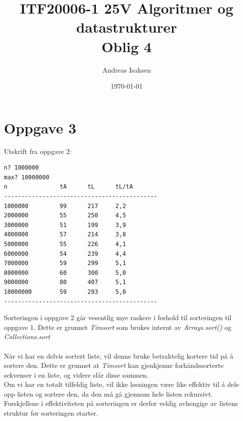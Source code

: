 \documentclass{article}
\begin{document}
  

\title{ITF20006-1 25V Algoritmer og datastrukturer\\Oblig 4}
\author{Andreas Isaksen}  
\date{\today}  
\maketitle  
\pagebreak

\section*{Oppgave 3}
Utskrift fra oppgave 2:
\begin{lstlisting}[language=bash, caption={Utskrift fra oppgave 2}]
n? 1000000
max? 10000000
n               tA      tL      tL/tA
--------------------------------------------
1000000         99      217     2,2  
2000000         55      250     4,5  
3000000         51      199     3,9  
4000000         57      214     3,8  
5000000         55      226     4,1  
6000000         54      239     4,4  
7000000         59      299     5,1  
8000000         60      300     5,0  
9000000         80      407     5,1  
10000000        59      293     5,0  
--------------------------------------------
\end{lstlisting}
Sorteringen i oppgave 2 går vesentlig mye raskere i forhold til sorteringen til oppgave 1. Dette er grunnet \textit{Timsort} som brukes internt av \textit{Arrays.sort()} og \textit{Collections.sort}\\\\
Når vi har en delvis sortert liste, vil denne bruke betraktelig kortere tid på å sortere den. Dette er grunnet at \textit{Timsort} kan gjenkjenne forhåndssorterte sekvenser i en liste, og videre slår disse sammen.\\
Om vi har en totalt tilfeldig liste, vil ikke løsningen være like effektiv til å dele opp listen og sortere den, da den må gå gjennom hele listen rekursivt.\\
Forskjellene i effektiviteten på sorteringen er derfor veldig avhengige av listens struktur før sorteringen starter.
\end{document}
